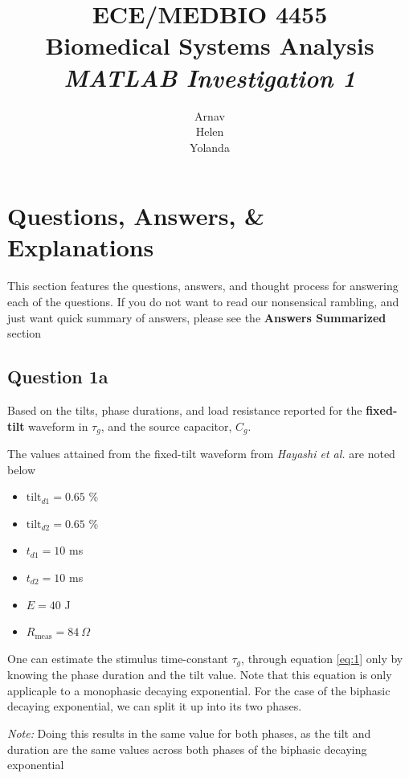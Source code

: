 \documentclass[]{report}
\title{\textbf{ECE/MEDBIO 4455} \\ Biomedical Systems Analysis \\ \textit{MATLAB Investigation 1}}
\author{Arnav \\ Helen \\ Yolanda}
\begin{document}
\maketitle
\newpage
\tableofcontents
\newpage

\chapter*{Questions, Answers, \& Explanations}

This section features the questions, answers, and thought process for answering each of the questions. If you do not want to read our nonsensical rambling, and just want quick summary of answers, please see the \textbf{Answers Summarized} section

\section*{Question 1a}

Based on the tilts, phase durations, and load resistance reported for the \textbf{fixed-tilt} waveform in $\tau_g$, and the source 
capacitor, $C_g$.


The values attained from the fixed-tilt waveform from \textit{Hayashi et al.} are noted below

\begin{itemize}
 	\item $\text{tilt}_{d1}  = 0.65$ \%
 	\item $\text{tilt}_{d2}  = 0.65$ \%
	\item $t_{d1} = 10$ ms
	\item $t_{d2} = 10$ ms
	\item $E        = 40$ J
	\item $R_\text{meas}   = 84 \ \Omega$
\end{itemize}
 
One can estimate the stimulus time-constant $\tau_g$, through equation \ref{eq:1} only by knowing the phase duration and the tilt value. Note that this equation is only applicaple to a monophasic decaying exponential. For the case of the biphasic decaying exponential, we can split it up into its two phases.

\textit{Note:} Doing this results in the same value for both phases, as the tilt and duration are the same values across both phases of the biphasic decaying exponential
\end{document}
